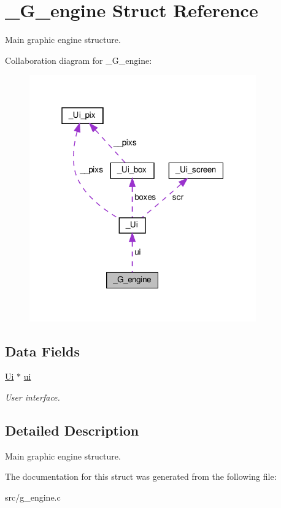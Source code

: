 \hypertarget{struct__G__engine}{}\section{\+\_\+\+G\+\_\+engine Struct Reference}
\label{struct__G__engine}


Main graphic engine structure.  




Collaboration diagram for \+\_\+\+G\+\_\+engine\+:\nopagebreak
\begin{figure}[H]
\begin{center}
\leavevmode
\includegraphics[width=277pt]{struct__G__engine__coll__graph}
\end{center}
\end{figure}
\subsection*{Data Fields}
\begin{DoxyCompactItemize}
\item 
\mbox{\label{struct__G__engine_abf87df76723f99d4d39a4d5f629777cb}} 
\hyperlink{struct__Ui}{Ui} $\ast$ \hyperlink{struct__G__engine_abf87df76723f99d4d39a4d5f629777cb}{ui}
\begin{DoxyCompactList}\small\item\em User interface. \end{DoxyCompactList}\end{DoxyCompactItemize}


\subsection{Detailed Description}
Main graphic engine structure. 

The documentation for this struct was generated from the following file\+:\begin{DoxyCompactItemize}
\item 
src/g\+\_\+engine.\+c\end{DoxyCompactItemize}
